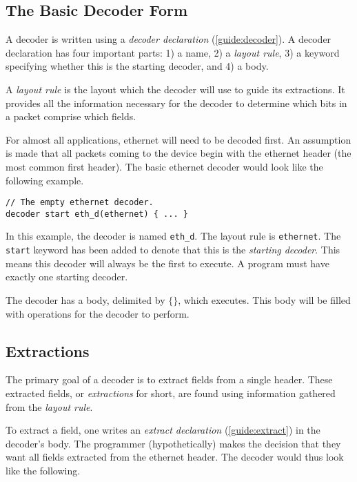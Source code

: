 \subsection{The Basic Decoder Form} \label{tut:basic_decoder}

A decoder is written using a \textit{decoder declaration} (\ref{guide:decoder}).
A decoder declaration has four important parts: 1) a name, 2) a \textit{layout
rule}, 3) a keyword specifying whether this is the starting decoder, and 4) a
body.

A \textit{layout rule} is the layout which the decoder
will use to guide its extractions. It provides all the information necessary for
the decoder to determine which bits in a packet comprise which fields.

For almost all applications, ethernet will need to be decoded first. An assumption is made that all packets coming to the device begin with the
ethernet header (the most common first header). The basic ethernet decoder would look like the following example.

\begin{codepage}
\begin{lstlisting}
// The empty ethernet decoder.
decoder start eth_d(ethernet) { ... }
\end{lstlisting}
\end{codepage}

In this example, the decoder is named \texttt{eth\_d}. The layout rule is
\texttt{ethernet}. The \texttt{start} keyword has been added to denote that this is the \textit{starting decoder}. This means this
decoder will always be the first to execute. A program must have exactly one
starting decoder. 

The decoder has a body, delimited by $\lbrace\rbrace$, which executes. This body will be filled with operations for the decoder to perform.

\subsection{Extractions} \label{tut:decoder_extract}

The primary goal of a decoder is to extract fields from a single header. These
extracted fields, or \textit{extractions} for short, are found using information
gathered from the \textit{layout rule}.

To extract a field, one writes an \textit{extract declaration}
(\ref{guide:extract}) in the decoder's body. The programmer (hypothetically) makes the decision that they want all fields
extracted from the ethernet header. The decoder would thus look like the following.

